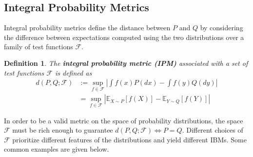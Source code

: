\documentclass[12pt]{article}
\newcommand*{\abs}[1]{\left\lvert#1\right\rvert}
\newcommand{\E}{\mathbb{E}}
\newcommand{\IPMClass}{\mathcal{F}} %
\newcommand{\dist}{P}
\newcommand{\distApprox}{Q}
\newcommand{\metric}{d}
\newtheorem{definition}{Definition}
\begin{document}
\subsection{Integral Probability Metrics}
Integral probability metrics define the distance between $\dist$ and $\distApprox$ by considering the difference between expectations computed using the two distributions over a 
family of test functions $\IPMClass$. 
\begin{definition}
The \textbf{integral probability metric (IPM)} associated with a set of test functions $\IPMClass$ is defined as 
\begin{align}
\metric(\dist, \distApprox; \IPMClass) 
&:= \sup_{f \in \IPMClass} \abs{\int f(x) P(dx) - \int f(y) Q(dy) } \\
&= \sup_{f \in \IPMClass} \abs{\E_{X \sim P}\left[f(X)\right] - \E_{Y \sim Q}\left[f(Y)\right] }
\end{align}
\end{definition}  
In order to be a valid metric on the space of probability distributions, the space $\IPMClass$ must be rich enough to guarantee 
$\metric(\dist, \distApprox; \IPMClass) \iff P = Q$. Different choices of $\IPMClass$ prioritize different features of the distributions and yield 
different IBMs. Some common examples are given below. 
\end{document}
